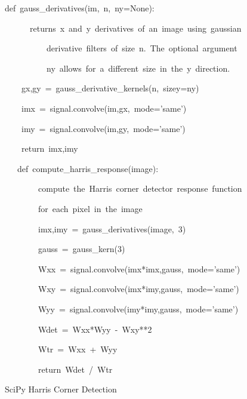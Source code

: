 \documentclass[english]{IEEEtran}
\theoremstyle{plain}
\newenvironment{lyxcode}
{\par\begin{list}{}{
\setlength{\rightmargin}{\leftmargin}
\setlength{\listparindent}{0pt}%
\raggedright
\setlength{\itemsep}{0pt}
\setlength{\parsep}{0pt}
\normalfont\ttfamily}%
 \item[]}
{\end{list}}
\begin{document}
%
\begin{algorithm*}
\begin{lyxcode}
def~gauss\_derivatives(im,~n,~ny=None):

~~~~~\textquotedbl{}\textquotedbl{}\textquotedbl{}~returns~x~and~y~derivatives~of~an~image~using~gaussian

~~~~~~~~~~derivative~filters~of~size~n.~The~optional~argument

~~~~~~~~~~ny~allows~for~a~different~size~in~the~y~direction.\textquotedbl{}\textquotedbl{}\textquotedbl{}

~~~~gx,gy~=~gauss\_derivative\_kernels(n,~sizey=ny)

~~~~imx~=~signal.convolve(im,gx,~mode='same')

~~~~imy~=~signal.convolve(im,gy,~mode='same')

~~~~return~imx,imy



~~~def~compute\_harris\_response(image):

~~~~~~~\textquotedbl{}\textquotedbl{}\textquotedbl{}~compute~the~Harris~corner~detector~response~function

~~~~~~~~for~each~pixel~in~the~image\textquotedbl{}\textquotedbl{}\textquotedbl{}

~~~~~~~~imx,imy~=~gauss\_derivatives(image,~3)

~~~~~~~~gauss~=~gauss\_kern(3)

~~~~~~~~Wxx~=~signal.convolve(imx{*}imx,gauss,~mode='same')

~~~~~~~~Wxy~=~signal.convolve(imx{*}imy,gauss,~mode='same')

~~~~~~~~Wyy~=~signal.convolve(imy{*}imy,gauss,~mode='same')

~~~~~~~~Wdet~=~Wxx{*}Wyy~-~Wxy{*}{*}2

~~~~~~~~Wtr~=~Wxx~+~Wyy

~~~~~~~~return~Wdet~/~Wtr
\end{lyxcode}
\caption{\label{alg:SciPy-Harris-Corner}SciPy Harris Corner Detection}

\end{algorithm*}
\end{document}
